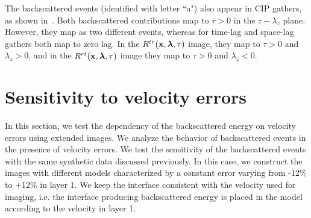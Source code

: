 The backscattered events (identified with letter ``a") also appear in CIP gathers, as shown in~. Both
backscattered contributions map to $\tau>0$ in the $\tau-\lambda_z$ plane. However, they map as two different events, whereas for time-lag and space-lag 
gathers both map to zero lag. In the $R^{tr}({\bf x},{\boldsymbol{\lambda}},\tau)$ image, they map to $\tau>0$ and $\lambda_z>0$, and in the $R^{rt}({\bf x},{\boldsymbol{\lambda}},\tau)$ image they map to $\tau>0$ and $\lambda_z<0$.





\section{Sensitivity to velocity errors}


In this section, we test the dependency of the backscattered energy on velocity errors using extended images.
We analyze the behavior of backscattered events in the presence of velocity errors.
We test the sensitivity of the backscattered events with the same synthetic data discussed previously. In this case, we construct the images
with different models characterized by a constant error varying from -12\% to +12\% in layer 1. We keep the interface 
consistent with the velocity used for imaging, i.e. the interface producing backscattered energy is placed in the model
according to the velocity in layer 1.

